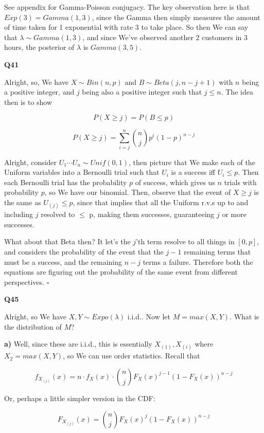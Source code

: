\documentclass{article}
\newcommand{\qed}{\hfill$\square$}
\begin{document}
			See appendix for Gamma-Poisson conjugacy. The key observation here is that $Exp(3) = Gamma(1, 3)$, since the Gamma then simply measures the amount of time taken for 1 exponential with rate 3 to take place. So then We can say that $\lambda\sim Gamma(1, 3)$, and since We've observed another 2 customers in 3 hours, the posterior of $\lambda$ is $Gamma(3, 5)$.
			
			\hfill
		
		\textbf{Q41}
		
			Alright, so, We have $X\sim Bin(n, p)$ and $B\sim Beta(j, n-j+1)$ with $n$ being a positive integer, and $j$ being also a positive integer such that $j\le n$. The idea then is to show
			
			\[ P(X\ge j) = P(B\le p) \]
			
			\[ P(X\ge j) = \sum^n_{i=j}{n\choose j} p^i(1-p)^{n-j} \]
			
			Alright, consider $U_1\cdots U_n\sim Unif(0, 1)$, then picture that We make each of the Uniform variables into a Bernoulli trial such that $U_i$ is a success iff $U_i\le p$. Then each Bernoulli trial has the probability $p$ of success, which gives us $n$ trials with probability $p$, so We have our binomial. Then, observe that the event of $X\ge j$ is the same as $U_{(j)} \le p$, since that implies that all the Uniform r.v.s up to and including $j$ resolved to $\le$ p, making them successes, guaranteeing $j$ or more successes.
			
			What about that Beta then? It let's the $j$'th term resolve to all things in $[0, p]$, and considers the probability of the event that the $j-1$ remaining terms that must be a success, and the remaining $n-j$ terms a failure. Therefore both the equations are figuring out the probability of the same event from different perspectives. \qed
			
		\hfill			
		
		\textbf{Q45}
			
			Alright, so We have $X, Y\sim Expo(\lambda)$ i.i.d.. Now let $M=max(X, Y)$. What is the distribution of $M$?
			
			\textbf{a)} Well, since these are i.i.d., this is essentially $X_{(1)}, X_{(i)}$ where $X_2 = max(X, Y)$, so We can use order statistics. Recall that
			
			\[ f_{X_{(j)}}(x) = n\cdot f_X(x)\cdot {n\choose j}F_X(x)^{j-1}(1-F_X(x))^{n-j} \]
			
			Or, perhaps a little simpler version in the CDF:
			
			\[ F_{X_{(j)}}(x) = {n\choose j}F_X(x)^j(1-F_X(x))^{n-j} \]
			
\end{document}
